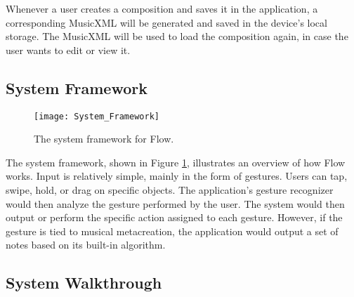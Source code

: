 Whenever a user creates a composition and saves it in the application, a corresponding MusicXML will be generated and saved in the device's local storage. The MusicXML will be used to load the composition again, in case the user wants to edit or view it. 

\subsection{System Framework}

\begin{figure}[H]
	\centering
	\texttt{[image: System\_Framework]}
    \caption{The system framework for Flow.}
    \label{fig:systemframework}
\end{figure}

The system framework, shown in Figure \ref{fig:systemframework}, illustrates an overview of how Flow works. Input is relatively simple, mainly in the form of gestures. Users can tap, swipe, hold, or drag on specific objects. The application's gesture recognizer would then analyze the gesture performed by the user. The system would then output or perform the specific action assigned to each gesture. However, if the gesture is tied to musical metacreation, the application would output a set of notes based on its built-in algorithm.

\subsection{System Walkthrough}

